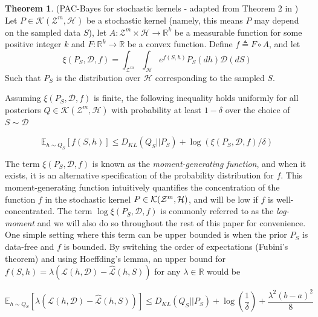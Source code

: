 \documentclass{article}
\theoremstyle{definition}
\newtheorem{theorem}{Theorem}[section]
\newcommand{\Expect}[2]{\mathbb{E}_{#1}\left [#2 \right ]}
\begin{document}
\begin{theorem} (PAC-Bayes for stochastic kernels - adapted from Theorem 2 in \citet{Rivasplata2020}) \label{thm:rivasplata-pb}
	Let $P\in \mathcal{K}(\mathcal{Z}^m, \mathcal{H})$ be a stochastic kernel (namely, this means $P$ may depend on the sampled data $S$), let $A: \mathcal{Z}^m\times \mathcal{H}\rightarrow \mathbb{R}^k$ be a measurable function for some positive integer $k$ and $F:\mathbb{R}^k\rightarrow \mathbb{R}$ be a convex function.
	Define $f\triangleq F\circ A$, and let 
	$$\xi(P_S, \mathcal{D}, f)=\int_{\mathcal{Z}^m}\int_{\mathcal{H}}e^{f(S, h)}P_S(dh)\mathcal{D}(dS)$$
	Such that $P_S$ is the distribution over $\mathcal{H}$ corresponding to the sampled $S$.
	
	Assuming $\xi(P_S, \mathcal{D}, f)$ is finite, the following inequality holds uniformly for all posteriors $Q\in \mathcal{K}(\mathcal{Z}^m, \mathcal{H})$ with probability at least $1-\delta$ over the choice of $S\sim \mathcal{D}$
	
	\begin{equation} \label{eq:ribasplata-pb}
	\Expect{h\sim Q_S}{f(S, h)} \leq D_{KL}(Q_S||P_S)+\log\left (\xi(P_S, \mathcal{D}, f)/\delta\right )
	\end{equation}
\end{theorem}

The term $\xi(P_S, \mathcal{D}, f)$ is known as the \emph{moment-generating function}, and when it exists, it is an alternative specification of the probability distribution for $f$.
This moment-generating function intuitively quantifies the concentration of the function $f$ in the stochastic kernel $P\in{\cal K}({\cal Z}^m,{\cal H})$, and will be low if $f$ is well-concentrated.
The term $\log\xi(P_S, \mathcal{D}, f)$ is commonly referred to as the \emph{log-moment} and we will also do so throughout the rest of this paper for convenience. 
One simple setting where this term can be upper bounded is when the prior $P_S$ is data-free and $f$ is bounded. By switching the order of expectations (Fubini's theorem) and using Hoeffding's lemma, an upper bound for $f(S,h)=\lambda(\mathcal{L}(h,\mathcal{D})-\hat{\mathcal{L}}(h, S))$ for any $\lambda\in \mathbb{R}$ would be

\begin{equation} \label{eq:bound-aml-datafree}
\Expect{h\sim Q_S}{\lambda(\mathcal{L}(h,\mathcal{D})-\hat{\mathcal{L}}(h, S))} \leq D_{KL}(Q_S||P_S)+\log\left (\frac{1}{\delta}\right ) + \frac{\lambda^2(b-a)^2}{8}
\end{equation}
\end{document}
